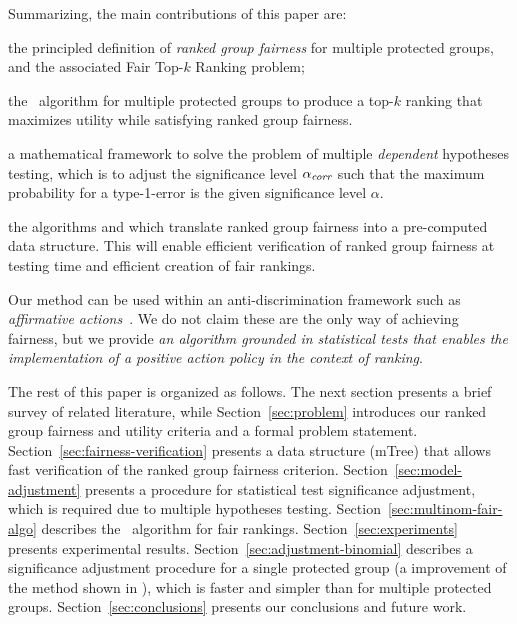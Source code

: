 Summarizing, the main contributions of this paper are:
\begin{compactenum}
	\item the principled definition of \emph{ranked group fairness} for multiple protected groups, and the associated  {\sc Fair Top-$k$ Ranking problem};
	\item the \algoFAIR\ algorithm for multiple protected groups to produce a top-$k$ ranking that maximizes utility while satisfying ranked group fairness.
	\item a mathematical framework to solve the problem of multiple \emph{dependent} hypotheses testing, which is to adjust the significance level $\alpha_\textit{corr}$ such that the  maximum probability for a type-1-error is the given significance level $\alpha$.
	\item the algorithms \algoComputeMTree and \algoCorrect which translate ranked group fairness into a pre-computed data structure. This will enable efficient verification of ranked group fairness at testing time and efficient creation of fair rankings.
\end{compactenum}

Our method can be used within an anti-discrimination framework such as \emph{affirmative actions}~\cite{sowell2005affirmative}.
%
We do not claim these are the only way of achieving fairness, but we provide \emph{an algorithm grounded in statistical tests that enables the implementation of a positive action policy in the context of ranking}.

The rest of this paper is organized as follows.
%
The next section presents a brief survey of related literature,
%
while Section~\ref{sec:problem} introduces our ranked group fairness and utility criteria and a formal problem statement.
%
Section~\ref{sec:fairness-verification} presents a data structure (mTree) that allows fast verification of the ranked group fairness criterion.
%
Section~\ref{sec:model-adjustment} presents a procedure for statistical test significance adjustment, which is required due to multiple hypotheses testing.
%
Section~\ref{sec:multinom-fair-algo} describes the \algoFAIR\ algorithm for fair rankings.
%
Section~\ref{sec:experiments} presents experimental results.
%
Section~\ref{sec:adjustment-binomial} describes a significance adjustment procedure for a single protected group (a improvement of the method shown in \cite{zehlike2017fair}), which is faster and simpler than for multiple protected groups.
%
Section~\ref{sec:conclusions} presents our conclusions and future work.
